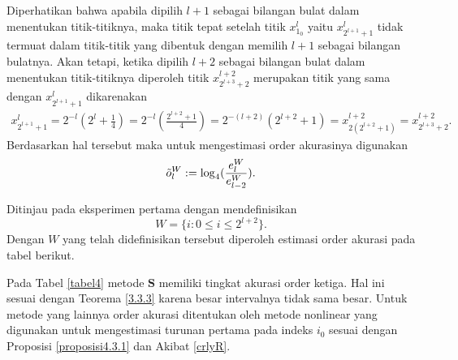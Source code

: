 Diperhatikan bahwa apabila dipilih $l+1$ sebagai bilangan bulat dalam menentukan titik-titiknya, maka titik tepat setelah titik $x_{1_0}^l$ yaitu $x_{2^{l+1}+1}^l$ tidak termuat dalam titik-titik yang dibentuk dengan memilih $l+1$ sebagai bilangan bulatnya. Akan tetapi, ketika dipilih $l+2$ sebagai bilangan bulat dalam menentukan titik-titiknya diperoleh titik $x_{2^{l+3}+2}^{l+2}$ merupakan titik yang sama dengan $x_{2^{l+1}+1}^l$ dikarenakan
\begin{align*}
    x_{2^{l+1}+1}^l = 2^{-l}(2^l + \frac{1}{4}) = 2^{-l}( \frac{2^{l+2} + 1}{4}) = 2^{-(l+2)}(2^{l+2} + 1) = x_{2(2^{l+2}+1)}^{l+2} = x_{2^{l+3}+2}^{l+2}.
\end{align*}
Berdasarkan hal tersebut maka untuk mengestimasi order akurasinya digunakan
\begin{align*}
    \Tilde{o}_l^W := \log_4(\frac{e_{l}^W}{e_{l-2}^W}).
\end{align*}

Ditinjau pada eksperimen pertama dengan mendefinisikan $$W = \{ i : 0 \leq i \leq 2^{l+2}\}.$$ Dengan $W$ yang telah didefinisikan tersebut diperoleh estimasi order akurasi pada tabel berikut.

\begin{table}[htp]
        \centering
        \caption{Tabel estimasi order akurasi eksperimen pertama dengan interval tidak sama besar $\hat{h}=\frac{3}{4}2^{-l}$, $l \in \{3,5,7,9\}$, $W=\{ i : 0\leq i \leq 2^{l+2} \}$}
        \label{tabel4}
    \end{table}

Pada Tabel \ref{tabel4} metode $\textbf{S}$ memiliki tingkat akurasi order ketiga. Hal ini sesuai dengan Teorema \ref{3.3.3} karena besar intervalnya tidak sama besar. Untuk metode yang lainnya order akurasi ditentukan oleh metode nonlinear yang digunakan untuk mengestimasi turunan pertama pada indeks $i_0$ sesuai dengan Proposisi \ref{proposisi4.3.1} dan Akibat \ref{crlyR}.

